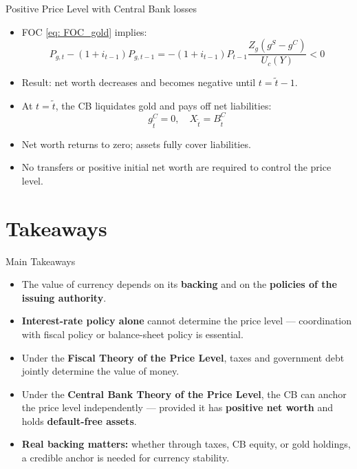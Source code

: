 \documentclass[11pt,aspectratio=169]{beamer}
\begin{document}
\begin{frame}{Positive Price Level with Central Bank losses}
\begin{itemize}
    \item FOC \eqref{eq: FOC_gold} implies:
    \[
        P_{g,t} - (1+i_{t-1}) P_{g,t-1} = -(1+i_{t-1}) P_{t-1} \frac{Z_g(g^S - g^C)}{U_c(Y)} < 0
    \]
    \item Result: net worth decreases and becomes negative until $t = \tilde{t}-1$.
\end{itemize}
\begin{itemize}
    \item At $t = \tilde{t}$, the CB liquidates gold and pays off net liabilities:
    \[
        g_{\tilde{t}}^C = 0, \quad X_{\tilde{t}} = B_{\tilde{t}}^C
    \]
    \item Net worth returns to zero; assets fully cover liabilities.
    \item No transfers or positive initial net worth are required to control the price level.
\end{itemize}
\end{frame}
\fi


\section{Takeaways}

\begin{frame}{Main Takeaways}

\begin{itemize}
  \item The value of currency depends on its \textbf{backing} and on the \textbf{policies of the issuing authority}.
  
  \vspace{0.2cm}
  \item \textbf{Interest-rate policy alone} cannot determine the price level — coordination with fiscal policy or balance-sheet policy is essential.
  
  \vspace{0.2cm}
  \item Under the \textbf{Fiscal Theory of the Price Level}, taxes and government debt jointly determine the value of money.
  
  \vspace{0.2cm}
  \item Under the \textbf{Central Bank Theory of the Price Level}, the CB can anchor the price level independently — provided it has \textbf{positive net worth} and holds \textbf{default-free assets}.
  
  \vspace{0.2cm}
  \item \textbf{Real backing matters:} whether through taxes, CB equity, or gold holdings, a credible anchor is needed for currency stability.
\end{itemize}
\end{frame}
\end{document}
